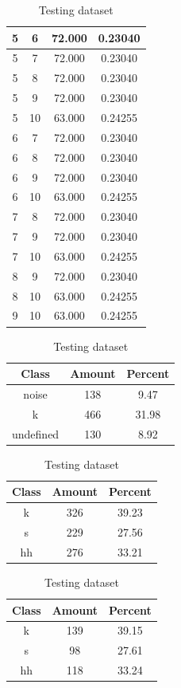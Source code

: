 \begin{table}
\begin{subtable}[tbp]{0.45\textwidth}
{\begin{tabular}{|c|c|c|c|}
 5 & 6 & 72.000 & 0.23040\\ \hline 
 5 & 7 & 72.000 & 0.23040\\ \hline 
 5 & 8 & 72.000 & 0.23040\\ \hline 
 5 & 9 & 72.000 & 0.23040\\ \hline 
 5 & 10 & 63.000 & 0.24255\\ \hline 
 6 & 7 & 72.000 & 0.23040\\ \hline 
 6 & 8 & 72.000 & 0.23040\\ \hline 
 6 & 9 & 72.000 & 0.23040\\ \hline 
 6 & 10 & 63.000 & 0.24255\\ \hline 
 7 & 8 & 72.000 & 0.23040\\ \hline 
 7 & 9 & 72.000 & 0.23040\\ \hline 
 7 & 10 & 63.000 & 0.24255\\ \hline 
 8 & 9 & 72.000 & 0.23040\\ \hline 
 8 & 10 & 63.000 & 0.24255\\ \hline 
 9 & 10 & 63.000 & 0.24255\\ \hline 

\end{tabular}
} \caption{xcsskew105}\label{xlsskew105}

\end{subtable}

\begin{subtable}[tbp]{0.45\textwidth}
\centering
\begin{tabular}{|c|c|c|}
\hline
Class & Amount & Percent\\ \hline
noise & 138 & 9.47\\ \hline
k & 466 & 31.98\\ \hline
undefined & 130 & 8.92\\ \hline
\end{tabular}
\caption{Entire dataset after stripping short sounds}
\end{subtable}
\hfill
\begin{subtable}[tbp]{0.45\textwidth}
\centering
\begin{tabular}{|c|c|c|}
\hline
Class & Amount & Percent\\ \hline
k & 326 & 39.23\\ \hline
s & 229 & 27.56\\ \hline
hh & 276 & 33.21\\ \hline
\end{tabular}
\caption{Training dataset}
\end{subtable}
\hfill
\begin{subtable}[tbp]{0.45\textwidth}
\centering
\begin{tabular}{|c|c|c|}
\hline
Class & Amount & Percent\\ \hline
k & 139 & 39.15\\ \hline
s & 98 & 27.61\\ \hline
hh & 118 & 33.24\\ \hline
\end{tabular}
\caption{Testing dataset}
\end{subtable}
\hfill


\end{table}

